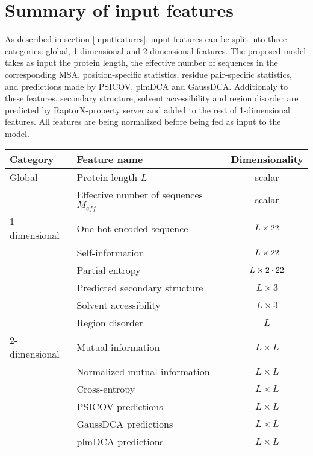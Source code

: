 \section{Summary of input features}

  As described in section \ref{inputfeatures}, input features can be split into three categories:
  global, 1-dimensional and 2-dimensional features.
  The proposed model takes as input the protein length, the effective number of sequences
  in the corresponding MSA, position-specific statistics,
  residue pair-specific statistics, and predictions made by PSICOV, plmDCA and GaussDCA.
  Additionaly to these features, secondary structure, solvent accessibility and
  region disorder are predicted by RaptorX-property server and added to the rest of
  1-dimensional features. All features are being normalized before being fed as input to the model.

  \begin{table}[H]
    \centering
    \begin{tabular}{|l|l|c|}
      \hline
      Category & Feature name & Dimensionality \\
      \hline
      \hline
      Global & Protein length $L$ & scalar \\
             & Effective number of sequences $M_{eff}$ & scalar \\
      \hline
      1-dimensional & One-hot-encoded sequence & $L \times 22$ \\
                    & Self-information & $L \times 22$ \\
                    & Partial entropy & $L \times 2 \cdot 22$ \\
                    & Predicted secondary structure & $L \times 3$ \\
                    & Solvent accessibility & $L \times 3$ \\
                    & Region disorder & $L$ \\
      \hline
      2-dimensional & Mutual information & $L \times L$ \\
                    & Normalized mutual information & $L \times L$ \\
                    & Cross-entropy & $L \times L$ \\
                    & PSICOV predictions & $L \times L$ \\
                    & GaussDCA predictions & $L \times L$ \\
                    & plmDCA predictions & $L \times L$ \\
      \hline
    \end{tabular}
    \label{tabinputfeatures}
  \end{table}
